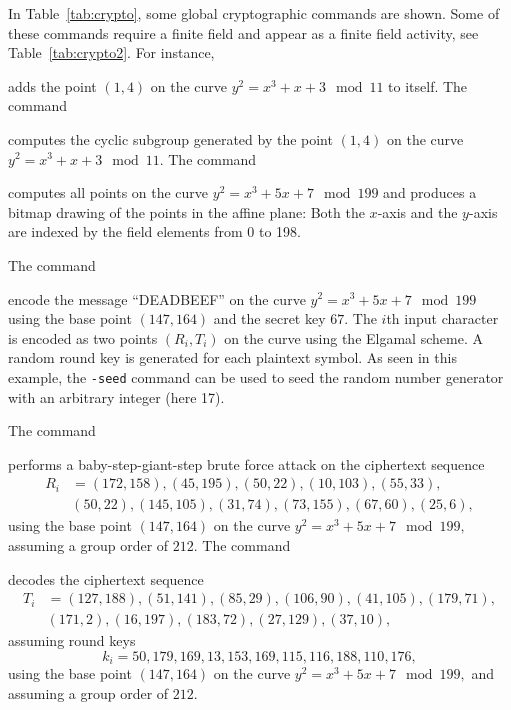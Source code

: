 In Table~\ref{tab:crypto}, some global cryptographic commands are shown.
Some of these commands require a finite field 
and appear as a finite field activity, 
see Table~\ref{tab:crypto2}.
For instance,


adds the point $(1,4)$ on the curve $y^2 = x^3 + x + 3 \mod 11$ to itself.
The command 


computes the cyclic subgroup generated by the point $(1,4)$ 
on the curve $y^2 = x^3 + x + 3 \mod 11.$
The command


computes all points on the curve $y^2 = x^3 + 5x + 7 \mod 199$ 
and produces a bitmap drawing of the points in the affine plane:
Both the $x$-axis and the $y$-axis 
are indexed by the field elements from 0 to 198.


\bigskip

The command


encode the message ``DEADBEEF'' on the curve  $y^2 = x^3 + 5x + 7 \mod 199$ 
using the base point $(147,164)$ and the secret key $67.$
The $i$th input character is encoded as two points 
$(R_i,T_i)$ on the curve using the Elgamal scheme.
A random round key is generated for each plaintext symbol. 
As seen in this example, the \verb'-seed' 
command can be used to seed the random number generator with 
an arbitrary integer (here 17).

\bigskip


The command


performs a baby-step-giant-step brute force attack on the ciphertext sequence
\begin{align*}
R_i &= (172,158),(45,195),(50,22),(10,103),(55,33),\\
&(50,22),(145,105),(31,74),(73,155),(67,60),(25,6),
\end{align*} 
using the base point $(147,164)$ on the curve  $y^2 = x^3 + 5x + 7 \mod 199,$ 
assuming a group order of $212.$ 
The command 


decodes the ciphertext sequence
\begin{align*}
T_i &= (127,188),(51,141),(85,29),(106,90),(41,105),(179,71),\\
&(171,2),(16,197),(183,72),(27,129),(37,10),
\end{align*} 
assuming round keys 
$$
k_i = 50,179,169,13,153,169,115,116,188,110,176,
$$
using the base point $(147,164)$ on the curve  $y^2 = x^3 + 5x + 7 \mod 199,$ 
and assuming a group order of $212.$ 

